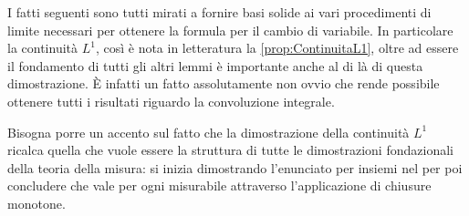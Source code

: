 I fatti seguenti sono tutti mirati a fornire basi solide ai vari procedimenti di limite necessari per ottenere la formula per il cambio di variabile.
In particolare la continuità $L^1$, così è nota in letteratura la \cref{prop:ContinuitaL1}, oltre ad essere il fondamento di tutti gli altri lemmi è importante anche al di là di questa dimostrazione. È infatti un fatto assolutamente non ovvio che rende possibile ottenere tutti i risultati riguardo la convoluzione integrale.

Bisogna porre un accento sul fatto che la dimostrazione della continuità $L^1$ ricalca quella che vuole essere la struttura di tutte le dimostrazioni fondazionali della teoria della misura: si inizia dimostrando l'enunciato per insiemi nel \semiring{} per poi concludere che vale per ogni misurabile attraverso l'applicazione di chiusure monotone.



